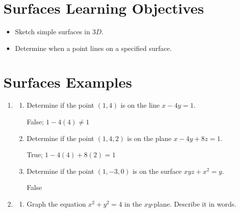 \documentclass[12pt]{exam}
\begin{document}
\section*{Surfaces Learning Objectives}
  \begin{itemize}
    \item{
      Sketch simple surfaces in $3D$.
    }
    \item{
      Determine when a point lines on a specified surface.
    }
  \end{itemize}
  
\section*{Surfaces Examples}
  \begin{enumerate}
    \item{
       \phantom{.}
       \begin{enumerate}
         \item{
           Determine if the point $(1,4)$ is on the line $x-4y=1$.

        }

          \begin{solution}
            False; \(1-4(4)\ne 1\)
          \end{solution}
         \item{
           Determine if the point $(1,4,2)$ is on the plane $x-4y+8z=1$.
           \begin{solution}
              True; \(1-4(4)+8(2)=1\)
           \end{solution}
         }
         \item{
           Determine if the point $(1,-3,0)$ is on the surface $xyz+x^2=y$.
            \begin{solution}
              False
           \end{solution} 
         }
       \end{enumerate} 
    }
    \item{
      \begin{enumerate}
        \item{
          Graph the equation $x^{2}+y^{2}=4$ in the $xy$-plane.
          Describe it in words.}
        \begin{solution}
          \begin{center}
\end{center}
\end{solution}
\end{enumerate}}
\end{enumerate}
\end{document}
